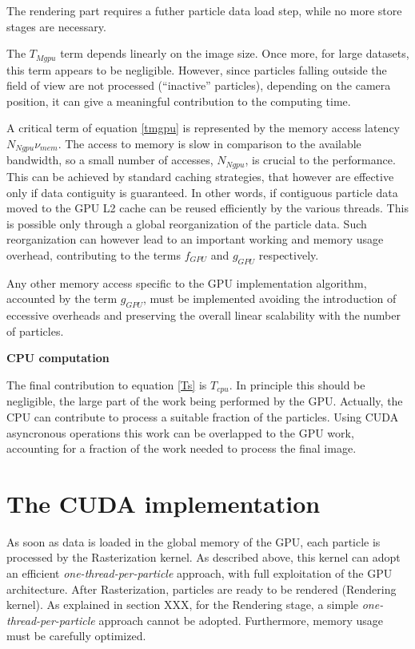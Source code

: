 \documentclass[11pt]{article}
\begin{document}
The rendering part requires a futher particle data load step, while no more store 
stages are necessary.

The $T_{Mgpu}$ term depends linearly on the image size. Once more, 
for large datasets, this term appears to be negligible. However, since
particles falling outside the field of view are not processed (``inactive'' particles),
depending on the camera position, it can give a meaningful contribution to
the computing time.

A critical term of equation \eqref{tmgpu} is represented by the memory access
latency $N_{Ngpu} \nu_{mem}$. The access to memory is slow in comparison to
the available bandwidth, so a small number of accesses, $N_{Ngpu}$, is crucial
to the performance. This can be achieved by standard caching strategies, that
however are effective only if data contiguity is guaranteed. In other words,
if contiguous particle data moved to the GPU L2 cache can be reused efficiently
by the various threads. This is possible only through a global reorganization 
of the particle data. Such reorganization can however lead to an important
working and memory usage overhead, contributing to the terms $f_{GPU}$ and
$g_{GPU}$ respectively. 

Any other memory access specific to the GPU implementation algorithm,
accounted by the term $g_{GPU}$, must be implemented 
avoiding the introduction of eccessive overheads and preserving the overall
linear scalability with the number of particles.

\medskip
\noindent
{\bf CPU computation}

The final contribution to equation \eqref{Ts} is $T_{cpu}$. In principle this should be negligible, 
the large part of the work being performed by the GPU. Actually, the CPU
can contribute to process a suitable fraction of the particles. Using
CUDA asyncronous operations this work can be overlapped 
to the GPU work, accounting for a fraction of the work needed to 
process the final image.

\section{The CUDA implementation}

As soon as data is loaded in the global memory of the GPU, each particle is processed 
by the Rasterization kernel.
As described above, this kernel can adopt an efficient  
{\it one-thread-per-particle} approach, with full exploitation of
the GPU architecture. 
After Rasterization, particles are ready to be rendered (Rendering kernel).
As explained in section XXX,
for the Rendering stage, a simple {\it one-thread-per-particle} approach
cannot be adopted. Furthermore, memory usage must be carefully optimized. 
\end{document}
